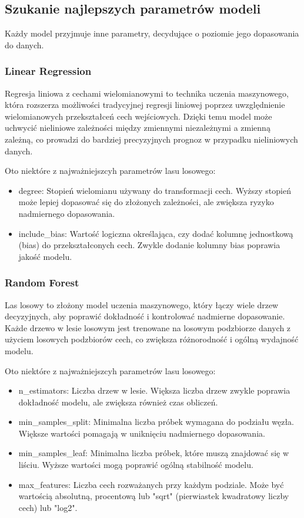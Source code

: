 \documentclass{article}
\begin{document}
\subsection{Szukanie najlepszych parametrów modeli}
Każdy model przyjmuje inne parametry, decydujące o poziomie jego dopasowania do danych. 

\subsubsection{Linear Regression}
Regresja liniowa z cechami wielomianowymi \cite{polynomial_features} to technika uczenia maszynowego, która rozszerza możliwości tradycyjnej regresji liniowej poprzez uwzględnienie wielomianowych przekształceń cech wejściowych. Dzięki temu model może uchwycić nieliniowe zależności między zmiennymi niezależnymi a zmienną zależną, co prowadzi do bardziej precyzyjnych prognoz w przypadku nieliniowych danych.

Oto niektóre z najważniejszcyh parametrów lasu losowego:
\begin{itemize}
\item degree: Stopień wielomianu używany do transformacji cech. Wyższy stopień może lepiej dopasować się do złożonych zależności, ale zwiększa ryzyko nadmiernego dopasowania.
\item include\_bias: Wartość logiczna określająca, czy dodać kolumnę jednostkową (bias) do przekształconych cech. Zwykle dodanie kolumny bias poprawia jakość modelu.
\end{itemize}


\subsubsection{Random Forest}
Las losowy \cite{random_forest} to złożony model uczenia maszynowego, który łączy wiele drzew decyzyjnych, aby poprawić dokładność i kontrolować nadmierne dopasowanie. Każde drzewo w lesie losowym jest trenowane na losowym podzbiorze danych z użyciem losowych podzbiorów cech, co zwiększa różnorodność i ogólną wydajność modelu.

Oto niektóre z najważniejszcyh parametrów lasu losowego:
\begin{itemize}
    \item n\_estimators: Liczba drzew w lesie. Większa liczba drzew zwykle poprawia dokładność modelu, ale zwiększa również czas obliczeń.
    \item min\_samples\_split: Minimalna liczba próbek wymagana do podziału węzła. Większe wartości pomagają w uniknięciu nadmiernego dopasowania.
    \item min\_samples\_leaf: Minimalna liczba próbek, które muszą znajdować się w liściu. Wyższe wartości mogą poprawić ogólną stabilność modelu.    
    \item max\_features: Liczba cech rozważanych przy każdym podziale. Może być wartością absolutną, procentową lub "sqrt" (pierwiastek kwadratowy liczby cech) lub "log2".
\end{itemize}
\end{document}
